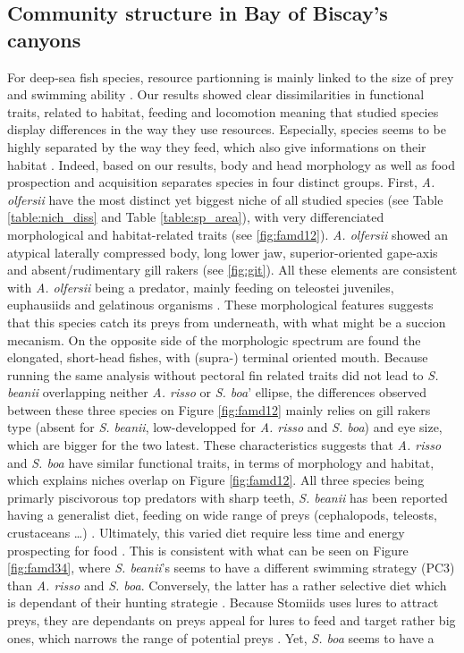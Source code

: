 
\subsection{Community structure in Bay of Biscay's canyons}

For deep-sea fish species, resource partionning is mainly linked to the size of prey and swimming ability \citep{aneeshkumar2017}. Our results showed clear dissimilarities in functional traits, related to habitat, feeding and locomotion meaning that studied species display differences in the way they use resources. Especially, species seems to be highly separated by the way they feed, which also give informations on their habitat \citep{schoenfuss2007}. Indeed, based on our results, body and head morphology as well as food prospection and acquisition separates species in four distinct groups. First, \textit{A. olfersii} have the most distinct yet biggest niche of all studied species (see Table \ref{table:nich_diss} and Table \ref{table:sp_area}), with very differenciated morphological and habitat-related traits (see \ref{fig:famd12}). \textit{A. olfersii} showed an atypical laterally compressed body, long lower jaw, superior-oriented gape-axis and absent/rudimentary gill rakers (see \ref{fig:git}). All these elements are consistent with \textit{A. olfersii} being a predator, mainly feeding on teleostei juveniles, euphausiids and gelatinous organisms \citep{eduardo2020}. These morphological features suggests that this species catch its preys from underneath, with what might be a succion mecanism. On the opposite side of the morphologic spectrum are found the elongated, short-head fishes, with (supra-) terminal oriented mouth. Because running the same analysis without pectoral fin related traits did not lead to \textit{S. beanii} overlapping neither \textit{A. risso} or \textit{S. boa}' ellipse, the differences observed between these three species on Figure \ref{fig:famd12} mainly relies on gill rakers type (absent for \textit{S. beanii}, low-developped for \textit{A. risso} and \textit{S. boa}) and eye size, which are bigger for the two latest. These characteristics suggests that \textit{A. risso} and \textit{S. boa} have similar functional traits, in terms of morphology and habitat, which explains niches overlap on Figure \ref{fig:famd12}. All three species being primarly piscivorous top predators with sharp teeth, \textit{S. beanii} has been reported having a generalist diet, feeding on wide range of preys (cephalopods, teleosts, crustaceans \ldots{}) \citep{geidner2008}. Ultimately, this varied diet require less time and energy prospecting for food \citep{geidner2008}. This is consistent with what can be seen on Figure \ref{fig:famd34}, where \textit{S. beanii}'s seems to have a different swimming strategy (PC3) than \textit{A. risso} and \textit{S. boa}. Conversely, the latter has a rather selective diet which is dependant of their hunting strategie \citep{sutton1996}. Because Stomiids uses lures to attract preys, they are dependants on preys appeal for lures to feed and target rather big ones, which narrows the range of potential preys \citep{geidner2008,germain2019}. Yet, \textit{S. boa} seems to have a 